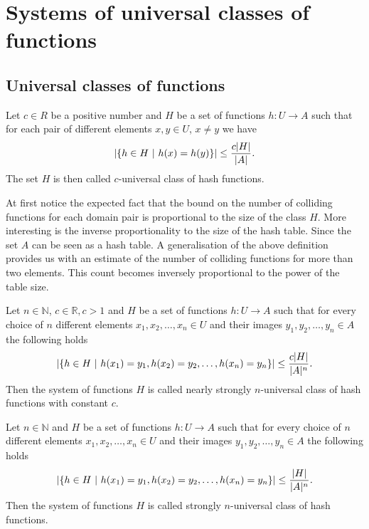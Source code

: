 \chapter{Systems of universal classes of functions}

\section{Universal classes of functions}

\begin{definition}
\label{c_universal_system}
Let $c \in R$ be a positive number and $H$ be a set of functions $h: U \rightarrow A$ such that for each pair of different elements $x, y \in U$, $x \neq y$ we have \[ \left| \lbrace h \in H \ | \  h(x) = h(y) \rbrace \right| \leq \frac {c |H|}{|A|} \textit{.} \] The set $H$ is then called $c$-universal class of hash functions.
\end{definition}

At first notice the expected fact that the bound on the number of colliding functions for each domain pair is proportional to the size of the class $H$. More interesting is the inverse proportionality to the size of the hash table. Since the set $A$ can be seen as a hash table. A generalisation of the above definition provides us with an estimate of the number of colliding functions for more than two elements. This count becomes inversely proportional to the power of the table size.

\begin{definition}
\label{nearly_strong_universal_n_system}
Let $n \in \mathbb{N}$, $c \in \mathbb{R}, c > 1$ and $H$ be a set of functions $h: U \rightarrow A$ such that for every choice of $n$ different elements $x_1, x_2, \dots, x_n \in U$ and their images $y_1, y_2, \dots, y_n \in A$ the following holds \[ \left|\lbrace h \in H \ | \  h(x_1) = y_1, h(x_2) = y_2, \dots, h(x_n) = y_n \rbrace \right| \leq \frac{c|H|}{|A|^n} \textit{.} \] Then the system of functions $H$ is called nearly strongly $n$-universal class of hash functions with constant $c$.
\end{definition}

\begin{definition}
\label{strong_universal_n_system}
Let $n \in \mathbb{N}$ and $H$ be a set of functions $h: U \rightarrow A$ such that for every choice of $n$ different elements $x_1, x_2, \dots, x_n \in U$ and their images $y_1, y_2, \dots, y_n \in A$ the following holds \[ \left|\lbrace h \in H \ | \  h(x_1) = y_1, h(x_2) = y_2, \dots, h(x_n) = y_n \rbrace \right| \leq \frac{|H|}{|A|^n} \textit{.} \] Then the system of functions $H$ is called strongly $n$-universal class of hash functions.
\end{definition}


